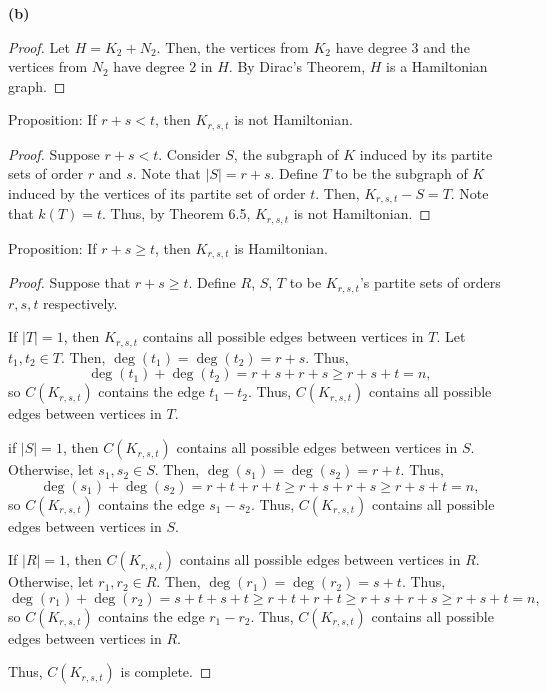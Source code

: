 \documentclass[12pt]{article}
\begin{document}
    {\bf (b)}
    \begin{proof}
	Let $H = K_2 + N_2$.
	Then, the vertices from $K_2$ have degree $3$ and the vertices from $N_2$ have degree $2$ in $H$.
	By Dirac's Theorem, $H$ is a Hamiltonian graph.
    \end{proof}


\newpage{} Proposition: If $r+s<t$, then $K_{r,s,t}$ is not Hamiltonian.
\begin{proof}
	Suppose $r + s < t$.
	Consider $S$, the subgraph of $K$ induced by its partite sets of order $r$ and $s$.
	Note that $|S| = r + s$.
	Define $T$ to be the subgraph of $K$ induced by the vertices of its partite set of order $t$.
	Then, $K_{r,s,t} - S = T$.
	Note that $k(T) = t$.
	Thus, by Theorem 6.5, $K_{r,s,t}$ is not Hamiltonian.
\end{proof}

\newpage{} Proposition: If $r+s \geq t$, then $K_{r,s,t}$ is Hamiltonian.
\begin{proof}
	Suppose that $r+s \geq t$.
	Define $R$, $S$, $T$ to be $K_{r,s,t}$'s partite sets of orders $r,s,t$ respectively.
	
	If $|T| = 1$, then $K_{r,s,t}$ contains all possible edges between vertices in $T$.
	Let $t_1,t_2 \in T$.
	Then, $\deg(t_1) = \deg(t_2) = r + s$.
	Thus, $$\deg(t_1) + \deg(t_2) = r + s + r + s \geq r + s + t = n,$$ so $C(K_{r,s,t})$ contains the edge $t_1-t_2$.
	Thus, $C(K_{r,s,t})$ contains all possible edges between vertices in $T$.

	if $|S| = 1$, then $C(K_{r,s,t})$ contains all possible edges between vertices in $S$.
	Otherwise, let $s_1, s_2 \in S$. 
	Then, $\deg(s_1) = \deg(s_2) = r + t$.
	Thus, $$\deg(s_1) + \deg(s_2) = r + t + r + t \geq r + s + r + s \geq r + s + t = n,$$ so $C(K_{r,s,t})$ contains the edge $s_1-s_2$.
	Thus, $C(K_{r,s,t})$ contains all possible edges between vertices in $S$.

	If $|R| = 1$, then $C(K_{r,s,t})$ contains all possible edges between vertices in $R$.
	Otherwise, let $r_1, r_2 \in R$.
	Then, $\deg(r_1) = \deg(r_2) = s + t$.
	Thus, $$\deg(r_1) + \deg(r_2) = s + t + s + t \geq r + t + r + t \geq r + s + r + s \geq r + s + t = n,$$ so $C(K_{r,s,t})$ contains the edge $r_1-r_2$.
	Thus, $C(K_{r,s,t})$ contains all possible edges between vertices in $R$.

	Thus, $C(K_{r,s,t})$ is complete.

\end{proof}
\end{document}
